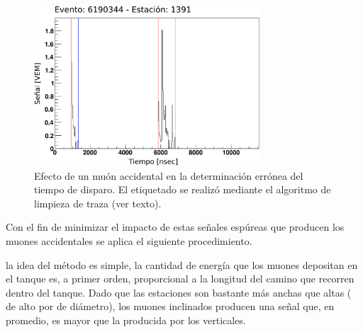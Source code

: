 		\begin{figure}[ht]
		\begin{center}
		\includegraphics[width=0.75\textwidth]{fig/seleccionAuger/badStartTime.pdf}
		\caption{Efecto de un muón accidental en la determinación errónea del tiempo de disparo. El etiquetado se realizó mediante el algoritmo de limpieza de traza (ver texto).}
		\label{fig:trazaMalTiempo}
		\end{center}
		\end{figure}
		
		Con el fin de minimizar el impacto de estas señales espúreas que producen los muones accidentales se aplica el siguiente procedimiento.
		
		 la idea del método es simple, la cantidad de energía que los muones depositan en el tanque es, a primer orden, proporcional a la longitud del camino que recorren dentro del tanque.
		Dado que las estaciones son bastante más anchas que altas ( de alto por  de diámetro), los muones inclinados producen una señal que, en promedio, es mayor que la producida por los verticales.
		

